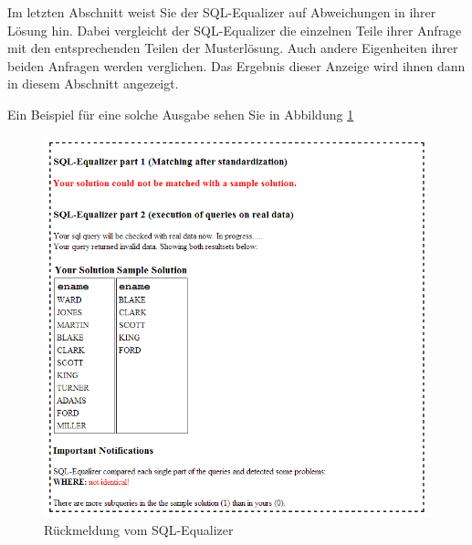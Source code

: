 \documentclass[12pt]{scrreprt}
\theoremstyle{remark}
\begin{document}
Im letzten Abschnitt weist Sie der SQL-Equalizer auf Abweichungen in ihrer Lösung hin. Dabei vergleicht der SQL-Equalizer die einzelnen Teile ihrer Anfrage mit den entsprechenden Teilen der Musterlösung. Auch andere Eigenheiten ihrer beiden Anfragen werden verglichen. Das Ergebnis dieser Anzeige wird ihnen dann in diesem Abschnitt angezeigt.

Ein Beispiel für eine solche Ausgabe sehen Sie in Abbildung \ref{fig:screen_user_1}

\begin{figure}[H]
\centering
\includegraphics[scale=0.61]{Bilder/screen_user_6.png}
\caption{Rückmeldung vom SQL-Equalizer}
\label{fig:screen_user_1}
\end{figure}


\end{document}
